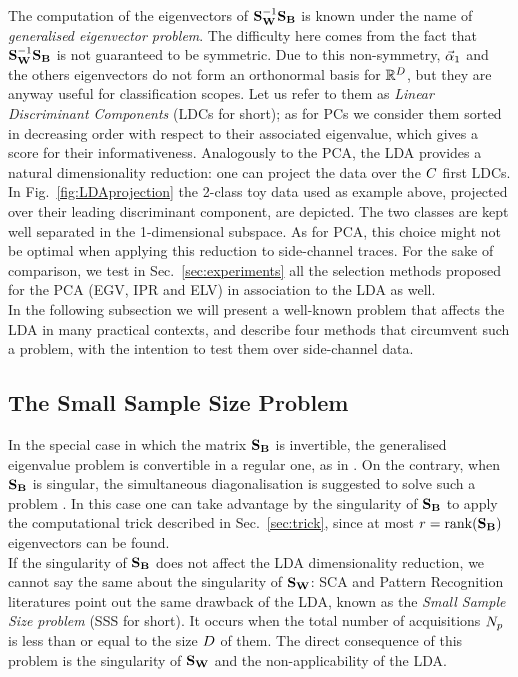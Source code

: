 The computation of the eigenvectors of $\textbf{S}_{\textbf{W}}^{-1} \textbf{S}_{\textbf{B}}$ is known under the name of {\em generalised eigenvector problem}. The difficulty here comes from the fact that $\textbf{S}_{\textbf{W}}^{-1} \textbf{S}_{\textbf{B}}$ is not guaranteed to be symmetric. Due to this non-symmetry,  $\vec{\alpha}_1$ and the others eigenvectors do not form an orthonormal basis for $\mathbb{R}^D$, but they are anyway useful for classification scopes. Let us refer to them as {\em Linear Discriminant Components} (LDCs for short); as for PCs we consider them sorted in decreasing order with respect to their associated eigenvalue, which gives a score for their informativeness. Analogously to the PCA, the LDA provides a natural dimensionality reduction: one can project the data over the $C$ first LDCs. In Fig.~\ref{fig:LDAprojection} the 2-class toy data used as example above, projected over their leading discriminant component, are depicted. The two classes are kept well separated in the 1-dimensional subspace. As for PCA, this choice might not be optimal when applying this reduction to side-channel traces. For the sake of comparison, we test in Sec.~\ref{sec:experiments} all the selection methods proposed for the PCA (EGV, IPR and ELV) in association to the LDA as well.\\

In the following subsection we will present a well-known problem that affects the LDA in many practical contexts, and describe four methods that circumvent such a problem, with the intention to test them over side-channel data.


\subsection{The Small Sample Size Problem}\label{sec:SSS}
In the special case in which the matrix $\textbf{S}_{\textbf{B}}$ is invertible, the generalised eigenvalue problem is convertible in a regular one, as in \cite{Standaert2008}. On the contrary, when $\textbf{S}_{\textbf{B}}$ is singular, the simultaneous diagonalisation is suggested to solve such a problem \cite{Fukunaga}. In this case one can take advantage by the singularity of $\textbf{S}_{\textbf{B}}$ to apply the computational trick described in Sec.~\ref{sec:trick}, since at most $r = \mathrm{rank}(\textbf{S}_{\textbf{B}})$ eigenvectors can be found.\\

If the singularity of $\textbf{S}_{\textbf{B}}$ does not affect the LDA dimensionality reduction, we cannot say the same about the singularity of $\textbf{S}_{\textbf{W}}$:  SCA and Pattern Recognition literatures point out the same drawback of the LDA, known as the {\em Small Sample Size problem} (SSS for short). It occurs when the total number of acquisitions $N_p$ is less than or equal to the size $D$ of them.
The direct consequence of this problem is the singularity of $\textbf{S}_{\textbf{W}}$ and the non-applicability of the LDA. \\

